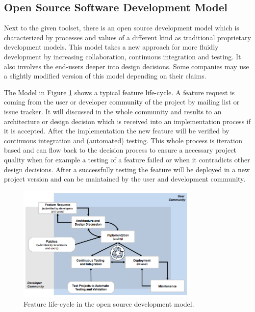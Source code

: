 \documentclass[DIV=calc,paper=a4,fontsize=9pt,twocolumn]{scrartcl}
\begin{document}
\subsection{Open Source Software Development Model}

Next to the given toolset, there is an open source development model which is characterized by processes and values of a different kind as traditional proprietary development models. This model takes a new approach for more fluidly development by increasing collaboration, continuous integration and testing. It also involves the end-users deeper into design decisions. Some companies may use a slightly modified version of this model depending on their claims. \citep{Haddad11}

The Model in Figure \ref{fig:feature-life-cycle} shows a typical feature life-cycle. A feature request is coming from the user or developer community of the project by mailing list or issue tracker. It will discussed in the whole community and results to an architecture or design decision which is received into an implementation process if it is accepted. After the implementation the new feature will be verified by continuous integration and (automated) testing. This whole process is iteration based and can flow back to the decision process to ensure a necessary project quality when for example a testing of a feature failed or when it contradicts other design decisions. After a successfully testing the feature will be deployed in a new project version and can be maintained by the user and development community. \citep{Haddad11}

\begin{figure}[ht]
    \includegraphics[width=0.8\textwidth ]{img/feature-life-cycle.png}{}
    \centering
    \caption{Feature life-cycle in the open source development model. \citet{Haddad11}}\label{fig:feature-life-cycle}
\end{figure}
\end{document}
